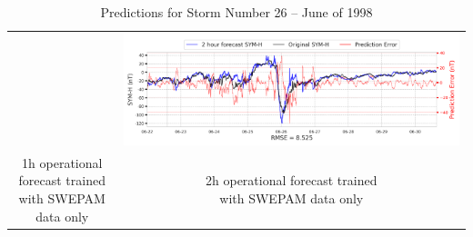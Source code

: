 \documentclass[draft,sw]{agutexSI2019}
\begin{document}
\begin{table}
\begin{tabular}{cc}
&
\includegraphics[width=0.49\linewidth]{paper_plots_shade/2h_swepam_rt/2h_swepam_rt_storm_26.png}
\\
\shortstack{1h operational forecast trained\\ with SWEPAM data only} & \shortstack{2h operational forecast trained\\ with SWEPAM data only}
\vspace*{12pt}
\\
\end{tabular}
\caption{Predictions for Storm Number 26 -- June of 1998}
\label{storm-26}
\end{table}
\end{document}
